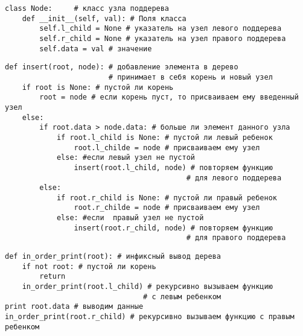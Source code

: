 \vspace{\baselineskip}
\begin{tcolorbox}
\begin{verbatim}
class Node:		# класс узла поддерева
	def __init__(self, val): # Поля класса
		self.l_child = None # указатель на узел левого поддерева
		self.r_child = None # указатель на узел правого поддерева
		self.data = val # значение 

\end{verbatim}
\end{tcolorbox}

\vspace{\baselineskip}

\vspace{\baselineskip}
\begin{tcolorbox}
\begin{verbatim}
def insert(root, node): # добавление элемента в дерево 
						# принимает в себя корень и новый узел
	if root is None: # пустой ли корень
		root = node # если корень пуст, то присваиваем ему введенный узел
	else:
		if root.data > node.data: # больше ли элемент данного узла
			if root.l_child is None: # пустой ли левый ребенок
				root.l_childe = node # присваиваем ему узел
			else: #если левый узел не пустой
				insert(root.l_child, node) # повторяем функцию 
										  # для левого поддерева
		else:
			if root.r_child is None: # пустой ли правый ребенок
				root.r_childe = node # присваиваем ему узел
			else: #если  правый узел не пустой
				insert(root.r_child, node) # повторяем функцию 
										  # для правого поддерева
\end{verbatim}
\end{tcolorbox}

\vspace{\baselineskip}

\vspace{\baselineskip}
\begin{tcolorbox}
\begin{verbatim}
def in_order_print(root): # инфиксный вывод дерева
	if not root: # пустой ли корень
		return
	in_order_print(root.l_child) # рекурсивно вызываем функцию 
								# с левым ребенком
print root.data # выводим данные
in_order_print(root.r_child) # рекурсивно вызываем функцию с правым ребенком
\end{verbatim}
\end{tcolorbox}


